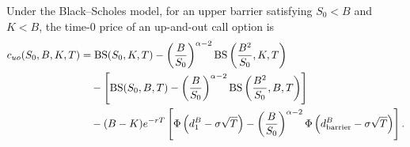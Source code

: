 \begin{theorem}\label{thm:uo-call}
    Under the Black--Scholes model, for an upper barrier satisfying $S_0 < B$ and $K < B$, the time-$0$ price of an up-and-out call option is
    \[
    \begin{aligned}
        c_{uo}(S_0, B, K, T) &= \operatorname{BS}(S_0, K, T) - \left(\frac{B}{S_0}\right)^{\alpha - 2}\operatorname{BS}\left(\frac{B^2}{S_0}, K, T\right) \\
        &\quad - \left[\operatorname{BS}(S_0, B, T) - \left(\frac{B}{S_0}\right)^{\alpha - 2}\operatorname{BS}\left(\frac{B^2}{S_0}, B, T\right)\right] \\
        &\quad - (B - K)e^{-rT}\left[\Phi\left(d_1^B - \sigma\sqrt{T}\right) - \left(\frac{B}{S_0}\right)^{\alpha - 2}\Phi\left(d_{\text{barrier}}^B - \sigma\sqrt{T}\right)\right].
    \end{aligned}
    \]
\end{theorem}

